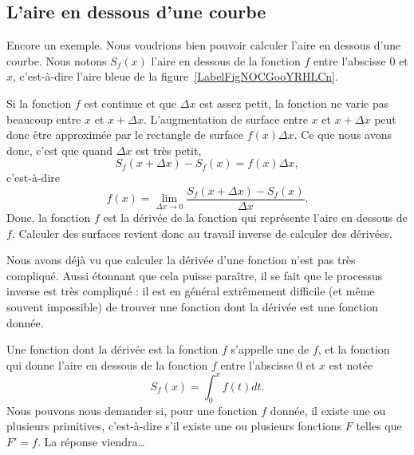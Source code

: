 \subsection{L'aire en dessous d'une courbe}		\label{SubSecAirePrimInto}

Encore un exemple. Nous voudrions bien pouvoir calculer l'aire en dessous d'une courbe. Nous notons $S_f(x)$ l'aire en dessous de la fonction $f$ entre l'abscisse $0$ et $x$, c'est-à-dire l'aire bleue de la figure~\ref{LabelFigNOCGooYRHLCn}. %
\newcommand{\CaptionFigNOCGooYRHLCn}{L'aire en dessous d'une courbe. Le rectangle rouge d'aire $f(x)\Delta x$ approxime l'augmentation de l'aire lorsqu'on passe de $x$ à $x+\Delta x$.}


Si la fonction $f$ est continue et que $\Delta x$ est assez petit, la fonction ne varie pas beaucoup entre $x$ et $x+\Delta x$. L'augmentation de surface entre $x$ et $x+\Delta x$ peut donc être approximée par le rectangle de surface $f(x)\Delta x$. Ce que nous avons donc, c'est que quand $\Delta x$ est très petit,
\begin{equation}
	S_f(x+\Delta x)-S_f(x)=f(x)\Delta x,
\end{equation}
c'est-à-dire
\begin{equation}
	f(x)=\lim_{\Delta x\to 0}\frac{  S_f(x+\Delta x)-S_f(x)}{ \Delta x }.
\end{equation}
Donc, la fonction $f$ est la dérivée de la fonction qui représente l'aire en dessous de $f$. Calculer des surfaces revient donc au travail inverse de calculer des dérivées.

Nous avons déjà vu que calculer la dérivée d'une fonction n'est pas très compliqué. Aussi étonnant que cela puisse paraître, il se fait que le processus inverse est très compliqué : il est en général extrêmement difficile (et même souvent impossible) de trouver une fonction dont la dérivée est une fonction donnée.

Une fonction dont la dérivée est la fonction $f$ s'appelle une  de $f$, et la fonction qui donne l'aire en dessous de la fonction $f$ entre l'abscisse $0$ et $x$ est notée
\begin{equation}
	S_f(x)=\int_0^xf(t)dt.
\end{equation}
Nous pouvons nous demander si, pour une fonction $f$ donnée, il existe une ou plusieurs primitives, c'est-à-dire s'il existe une ou plusieurs fonctions $F$ telles que $F'=f$. La réponse viendra\ldots

